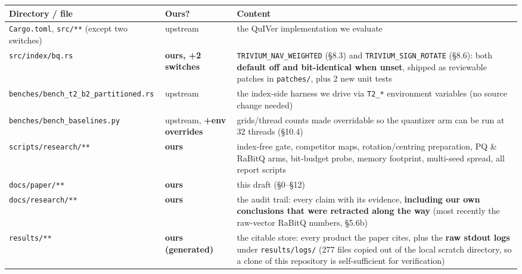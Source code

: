 \documentclass[
  10pt,
]{article}
\newcounter{none} %
\begin{document}
{\def\LTcaptype{none} %
\begin{longtable}[]{@{}
  >{\raggedright\arraybackslash}p{}
  >{\raggedright\arraybackslash}p{}
  >{\raggedright\arraybackslash}p{}@{}}
\toprule\noalign{}
\begin{minipage}[b]{\linewidth}\raggedright
Directory / file
\end{minipage} & \begin{minipage}[b]{\linewidth}\raggedright
Ours?
\end{minipage} & \begin{minipage}[b]{\linewidth}\raggedright
Content
\end{minipage} \\
\midrule\noalign{}
\endhead
\bottomrule\noalign{}
\endlastfoot
\texttt{Cargo.toml}, \texttt{src/**} (except two switches) & upstream &
the QuIVer implementation we evaluate \\
\texttt{src/index/bq.rs} & \textbf{ours, +2 switches} &
\texttt{TRIVIUM\_NAV\_WEIGHTED} (§8.3) and
\texttt{TRIVIUM\_SIGN\_ROTATE} (§8.6): both \textbf{default off and
bit-identical when unset}, shipped as reviewable patches in
\texttt{patches/}, plus 2 new unit tests \\
\texttt{benches/bench\_t2\_b2\_partitioned.rs} & upstream & the
index-side harness we drive via \texttt{T2\_*} environment variables (no
source change needed) \\
\texttt{benches/bench\_baselines.py} & upstream, \textbf{+env overrides}
& grids/thread counts made overridable so the quantizer arm can be run
at 32 threads (§10.4) \\
\texttt{scripts/research/**} & \textbf{ours} & index-free gate,
competitor maps, rotation/centring preparation, PQ \& RaBitQ arms,
bit-budget probe, memory footprint, multi-seed spread, all report
scripts \\
\texttt{docs/paper/**} & \textbf{ours} & this draft (§0--§12) \\
\texttt{docs/research/**} & \textbf{ours} & the audit trail: every claim
with its evidence, \textbf{including our own conclusions that were
retracted along the way} (most recently the raw-vector RaBitQ numbers,
§5.6b) \\
\texttt{results/**} & \textbf{ours (generated)} & the citable store:
every product the paper cites, plus the \textbf{raw stdout logs} under
\texttt{results/logs/} (277 files copied out of the local scratch
directory, so a clone of this repository is self-sufficient for
verification) \\
\end{longtable}
}
\end{document}
